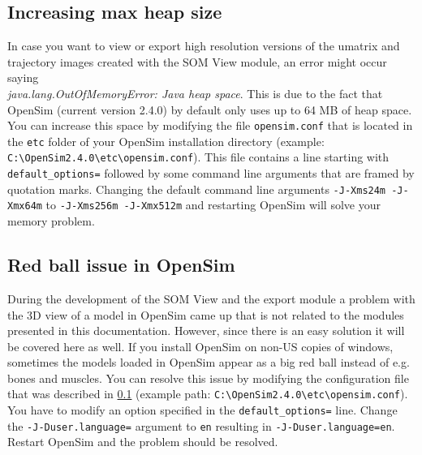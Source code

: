 \documentclass[a4paper]{scrartcl}
\begin{document}
\subsection{Increasing max heap size}
\label{sec:max-heap-size}
In case you want to view or export high resolution versions of the umatrix and trajectory images created with the SOM View module, an error might occur saying \\ 
\textit{java.lang.OutOfMemoryError: Java heap space}. This is due to the fact that OpenSim (current version 2.4.0) by default only uses up to 64 MB of heap space. You can increase this space by modifying the file \verb|opensim.conf| that is located in the \verb|etc| folder of your OpenSim installation directory (example: \verb|C:\OpenSim2.4.0\etc\opensim.conf|).
This file contains a line starting with \verb|default_options=| followed by some command line arguments that are framed by quotation marks.
Changing the default command line arguments \verb|-J-Xms24m -J-Xmx64m| to \verb|-J-Xms256m -J-Xmx512m| and restarting OpenSim will solve your memory problem.
\subsection{Red ball issue in OpenSim}
During the development of the SOM View and the export module a problem with the 3D view of a model in OpenSim came up that is not related to the modules presented in this documentation. However, since there is an easy solution it will be covered here as well. If you install OpenSim on non-US copies of windows, sometimes the models loaded in OpenSim appear as a big red ball instead of e.g. bones and  muscles. You can resolve this issue by modifying the configuration file that was described in \ref{sec:max-heap-size} (example path: \verb|C:\OpenSim2.4.0\etc\opensim.conf|).
You have to modify an option specified in the \verb|default_options=| line. Change the \verb|-J-Duser.language=| argument to \verb|en| resulting in \verb|-J-Duser.language=en|. Restart OpenSim and the problem should be resolved.



\end{document}
